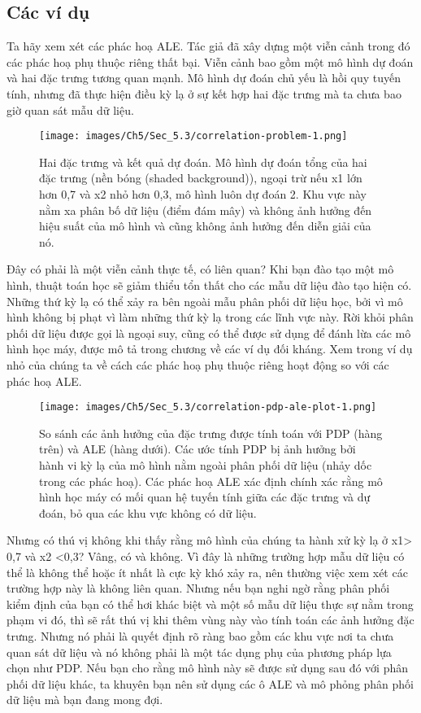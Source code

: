 \subsection{Các ví dụ}
Ta hãy xem xét các phác hoạ ALE. Tác giả đã xây dựng một viễn cảnh trong đó các phác hoạ phụ thuộc riêng thất bại. Viễn cảnh bao gồm một mô hình dự đoán và hai đặc trưng tương quan mạnh. Mô hình dự đoán chủ yếu là hồi quy tuyến tính, nhưng đã thực hiện điều kỳ lạ ở sự kết hợp hai đặc trưng mà ta chưa bao giờ quan sát mẫu dữ liệu.

\begin{figure*}[h!]
	\centering
	\texttt{[image: images/Ch5/Sec\_5.3/correlation-problem-1.png]}
	\label{fig:5_14}
	\caption{ Hai đặc trưng và kết quả dự đoán. Mô hình dự đoán tổng của hai đặc trưng (nền bóng (shaded background)), ngoại trừ nếu x1 lớn hơn 0,7 và x2 nhỏ hơn 0,3, mô hình luôn dự đoán 2. Khu vực này nằm xa phân bố dữ liệu (điểm đám mây) và không ảnh hưởng đến hiệu suất của mô hình và cũng không ảnh hưởng đến diễn giải của nó.}
\end{figure*}


Đây có phải là một viễn cảnh thực tế, có liên quan? Khi bạn đào tạo một mô hình, thuật toán học sẽ giảm thiểu tổn thất cho các mẫu dữ liệu đào tạo hiện có. Những thứ kỳ lạ có thể xảy ra bên ngoài mẫu phân phối dữ liệu học, bởi vì mô hình không bị phạt vì làm những thứ kỳ lạ trong các lĩnh vực này. Rời khỏi phân phối dữ liệu được gọi là ngoại suy, cũng có thể được sử dụng để đánh lừa các mô hình học máy, được mô tả trong chương về các ví dụ đối kháng. Xem trong ví dụ nhỏ của chúng ta về cách các phác hoạ phụ thuộc riêng hoạt động so với các phác hoạ ALE.



\begin{figure*}[h!]
	\centering
	\texttt{[image: images/Ch5/Sec\_5.3/correlation-pdp-ale-plot-1.png]}
	\label{fig:5_15}
	\caption{So sánh các ảnh hưởng của đặc trưng được tính toán với PDP (hàng trên) và ALE (hàng dưới). Các ước tính PDP bị ảnh hưởng bởi hành vi kỳ lạ của mô hình nằm ngoài phân phối dữ liệu (nhảy dốc trong các phác hoạ). Các phác hoạ ALE xác định chính xác rằng mô hình học máy có mối quan hệ tuyến tính giữa các đặc trưng và dự đoán, bỏ qua các khu vực không có dữ liệu.}
\end{figure*}
 

Nhưng có thú vị không khi thấy rằng mô hình của chúng ta hành xử kỳ lạ ở x1> 0,7 và x2 <0,3? Vâng, có và không. Vì đây là những trường hợp mẫu dữ liệu có thể là không thể hoặc ít nhất là cực kỳ khó xảy ra, nên thường việc xem xét các trường hợp này là không liên quan. Nhưng nếu bạn nghi ngờ rằng phân phối kiểm định của bạn có thể hơi khác biệt và một số mẫu dữ liệu thực sự nằm trong phạm vi đó, thì sẽ rất thú vị khi thêm vùng này vào tính toán các ảnh hưởng đặc trưng. Nhưng nó phải là quyết định rõ ràng bao gồm các khu vực nơi ta chưa quan sát dữ liệu và nó không phải là một tác dụng phụ của phương pháp lựa chọn như PDP. Nếu bạn cho rằng mô hình này sẽ được sử dụng sau đó với phân phối dữ liệu khác, ta khuyên bạn nên sử dụng các ô ALE và mô phỏng phân phối dữ liệu mà bạn đang mong đợi.


